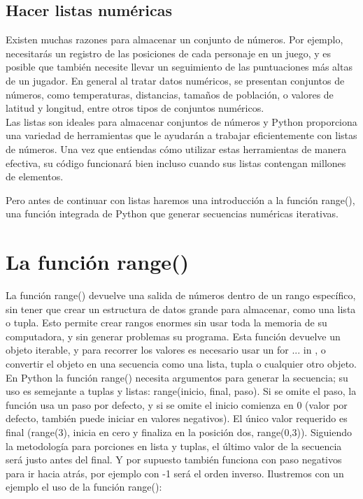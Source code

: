\subsection{Hacer listas numéricas}

Existen muchas razones para almacenar un conjunto de números. Por ejemplo, necesitarás
un registro de las posiciones de cada personaje en un juego, y  es posible que también  necesite 
llevar un seguimiento de las puntuaciones más altas de un jugador. En general al tratar datos numéricos, se presentan conjuntos de números, como temperaturas, distancias, tamaños de población, o valores de latitud y longitud, entre otros tipos de conjuntos numéricos.\\

Las listas son ideales para almacenar conjuntos de números y Python proporciona una variedad
de herramientas que le ayudarán a trabajar eficientemente con listas de números. Una vez que entiendas cómo utilizar estas herramientas de manera efectiva, su código funcionará bien incluso cuando
sus listas contengan  millones de elementos.


Pero antes de continuar con listas haremos una introducción a la función {\ttfamily range()},  una función integrada de Python que generar secuencias numéricas iterativas.


\section{La función range()}\label{rango}   %

La función  {\ttfamily range()} devuelve una salida de números dentro de un rango específico,  sin tener que crear un estructura de datos grande para almacenar, como una lista o tupla. Esto  permite crear rangos enormes sin usar toda la 
memoria de su computadora, y sin generar problemas su programa. Esta función devuelve un objeto iterable, y para recorrer los valores es  necesario usar un  {\ttfamily for ... in} , o convertir el objeto en una secuencia como una lista, tupla o cualquier otro objeto.\\  


En Python la función {\ttfamily range()}  necesita argumentos para generar la secuencia;  su uso es semejante a  tuplas y listas:
{\ttfamily range(inicio, final, paso)}. Si se omite el paso, la función usa un paso por defecto, y si se omite el inicio comienza en 0 (valor por defecto, también puede iniciar en valores negativos). El único valor requerido es final ({\ttfamily range(3)}, inicia en cero y finaliza en la posición dos, {\ttfamily range(0,3)}). Siguiendo la metodología para porciones en lista y tuplas, el último valor de la secuencia será justo antes del final. Y por supuesto también funciona con paso negativos para ir hacia atrás, por ejemplo con -1 será el orden inverso. Ilustremos con un ejemplo el uso de la función {\ttfamily range()}:

